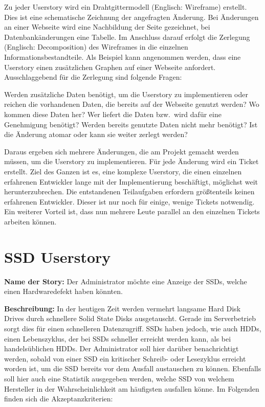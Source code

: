Zu jeder Userstory wird ein Drahtgittermodell (Englisch: Wireframe) erstellt.
Dies ist eine schematische Zeichnung der angefragten Änderung. Bei Änderungen
an einer Webseite wird eine Nachbildung der Seite gezeichnet, bei
Datenbankänderungen eine Tabelle. Im Anschluss darauf erfolgt die Zerlegung
(Englisch: Decomposition) des Wireframes in die einzelnen
Informationsbestandteile. Als Beispiel kann angenommen werden, dass eine
Userstory einen zusätzlichen Graphen auf einer Webseite anfordert.
Ausschlaggebend für die Zerlegung sind folgende Fragen:

\begin{outline}
  \1 Werden zusätzliche Daten benötigt, um die Userstory zu implementieren oder
  reichen die vorhandenen Daten, die bereits auf der Webseite genutzt werden?
  \1 Wo kommen diese Daten her?
  \1 Wer liefert die Daten bzw.\ wird dafür eine Genehmigung benötigt?
  \1 Werden bereits genutzte Daten nicht mehr benötigt?
  \1 Ist die Änderung atomar oder kann sie weiter zerlegt werden?
\end{outline}

Daraus ergeben sich mehrere Änderungen, die am Projekt gemacht werden müssen,
um die Userstory zu implementieren. Für jede Änderung wird ein Ticket erstellt.
Ziel des Ganzen ist es, eine komplexe Userstory, die einen einzelnen erfahrenen
Entwickler lange mit der Implementierung beschäftigt, möglichst weit
herunterzubrechen. Die entstandenen Teilaufgaben erfordern größtenteils keinen
erfahrenen Entwickler. Dieser ist nur noch für einige, wenige Tickets
notwendig.  Ein weiterer Vorteil ist, dass nun mehrere Leute parallel an den
einzelnen Tickets arbeiten können.
\tm%

\section{SSD Userstory}
\textbf{Name der Story:} Der Administrator möchte eine Anzeige der SSDs, welche
einen Hardwaredefekt haben könnten.

\textbf{Beschreibung:} In der heutigen Zeit werden vermehrt langsame
Hard Disk Drives durch schnellere Solid State Disks ausgetauscht. Gerade im
Serverbetrieb sorgt dies für einen schnelleren Datenzugriff. SSDs haben
jedoch, wie auch HDDs, einen Lebenszyklus, der bei SSDs schneller erreicht
werden kann, als bei handelsüblichen HDDs. Der Administrator soll hier darüber
benachrichtigt werden, sobald von einer SSD ein kritischer Schreib- oder
Lesezyklus erreicht worden ist, um die SSD bereits vor dem Ausfall austauschen
zu können. Ebenfalls soll hier auch eine Statistik ausgegeben werden, welche
SSD von welchem Hersteller in der Wahrscheinlichkeit am häufigsten ausfallen
könne. Im Folgenden finden sich die Akzeptanzkriterien:

